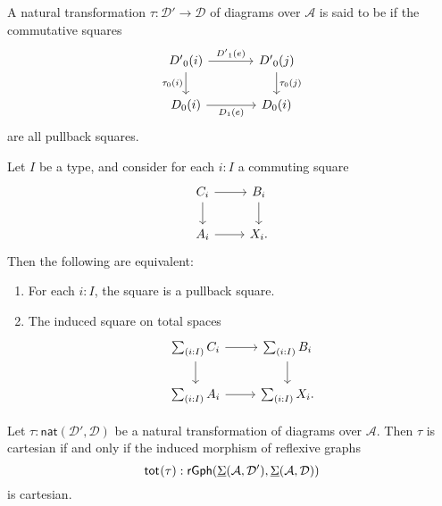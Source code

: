 \begin{defn}\label{defn:cartesian}
A natural transformation $\tau:\mathcal{D}'\to \mathcal{D}$ of diagrams over $\mathcal{A}$ is said to be  if the commutative squares
\begin{equation*}
\begin{tikzcd}[column sep=large]
\pts{D'}(i) \arrow[r,"{\edg{D'}(e)}"] \arrow[d,swap,"\pts{\tau}(i)"] & \pts{D'}(j) \arrow[d,"\pts{\tau}(j)"] \\
\pts{D}(i) \arrow[r,swap,"{\edg{D}(e)}"] & \pts{D}(i)
\end{tikzcd}
\end{equation*}
are all pullback squares. 
\end{defn}

\begin{lem}\label{lem:pb_total}
Let $I$ be a type, and consider for each $i:I$ a commuting square
\begin{equation*}
\begin{tikzcd}
C_i \arrow[r] \arrow[d] & B_i \arrow[d] \\
A_i \arrow[r] & X_i.
\end{tikzcd}
\end{equation*}
Then the following are equivalent:
\begin{enumerate}
\item For each $i:I$, the square is a pullback square.
\item The induced square on total spaces
\begin{equation*}
\begin{tikzcd}
\sm{i:I}C_i \arrow[r] \arrow[d] & \sm{i:I}B_i \arrow[d] \\
\sm{i:I}A_i \arrow[r] & \sm{i:I}X_i.
\end{tikzcd}
\end{equation*}
\end{enumerate}
\end{lem}

\begin{lem}
Let $\tau:\mathsf{nat}(\mathcal{D}',\mathcal{D})$ be a natural transformation of diagrams over $\mathcal{A}$. Then $\tau$ is cartesian if and only if the induced morphism of reflexive graphs
\begin{equation*}
\mathsf{tot}_{}(\tau) : \mathsf{rGph}(\underline{\Sigma}(\mathcal{A},\mathcal{D}'),\underline{\Sigma}(\mathcal{A},\mathcal{D}))
\end{equation*}
is cartesian.
\end{lem}

